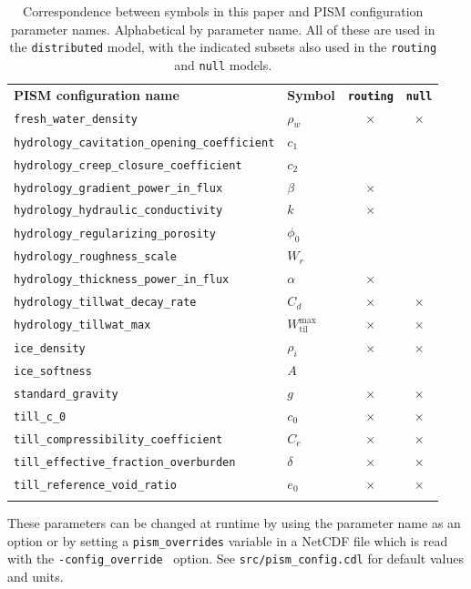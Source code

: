 \documentclass[gmd]{copernicus}   %
\newcommand{\text}{\textrm}
\newcommand{\Wtilmax}{W_{\text{til}}^{\text{max}}}
\begin{document}
\begin{table}[t]
  \caption{Correspondence between symbols in this paper and PISM configuration parameter names.  Alphabetical by parameter name.  All of these are used in the \texttt{distributed} model, with the indicated subsets also used in the \texttt{routing} and \texttt{null} models.} \vskip4mm \centering
  \begin{tabular}{llcc} \tophline
    \textbf{PISM configuration name} & \textbf{Symbol} & \textbf{\texttt{routing}} & \textbf{\texttt{null}} \\
    \middlehline
    \verb|fresh_water_density| & $\rho_w$ & $\times$ & $\times$ \\
    \verb|hydrology_cavitation_opening_coefficient| & $c_1$ \\
    \verb|hydrology_creep_closure_coefficient| & $c_2$ \\
    \verb|hydrology_gradient_power_in_flux| &  $\beta$ & $\times$ & \\
    \verb|hydrology_hydraulic_conductivity| & $k$ & $\times$ & \\
    \verb|hydrology_regularizing_porosity| & $\phi_0$ \\
    \verb|hydrology_roughness_scale| & $W_r$ \\
    \verb|hydrology_thickness_power_in_flux| &  $\alpha$ & $\times$ & \\
    \verb|hydrology_tillwat_decay_rate| & $C_d$ & $\times$ & $\times$ \\
    \verb|hydrology_tillwat_max| & $\Wtilmax$ & $\times$ & $\times$ \\
    \verb|ice_density| & $\rho_i$ & $\times$ & $\times$ \\
    \verb|ice_softness| & $A$ \\
    \verb|standard_gravity| & $g$ & $\times$ & $\times$ \\
    \verb|till_c_0| & $c_0$ & $\times$ & $\times$ \\
    \verb|till_compressibility_coefficient| & $C_c$ & $\times$ & $\times$ \\
    \verb|till_effective_fraction_overburden| & $\delta$ & $\times$ & $\times$ \\
    \verb|till_reference_void_ratio| & $e_0$ & $\times$ & $\times$ \\
    \bottomhline
  \end{tabular}
  \label{tab:correspondence}
\end{table}

These parameters can be changed at runtime by using the parameter name as an option or by setting a \verb|pism_overrides| variable in a NetCDF file which is read with the \verb|-config_override | option.  See \verb|src/pism_config.cdl| for default values and units.
\end{document}
